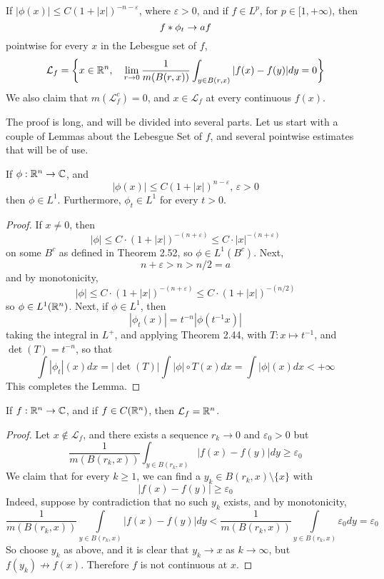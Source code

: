 \documentclass[../../main.tex]{subfiles}
\begin{document}
\providecommand{\wl}{\mathcal{L}}
\begin{wts}
    If $|\phi(x)|\leq C(1+|x|)^{-n-\varepsilon}$, where $\varepsilon>0$, and if $f\in L^p$, for $p\in[1,+\infty)$, then \[f\ast \phi_t\to af\]
    pointwise for every $x$ in the Lebesgue set of $f$, \[\mathcal{L}_f = \biggl\{{x\in\mathbb{R}^n,\quad\lim_{r\to 0}\dfrac{1}{m(B(r,x))}\int_{y\in B(r,x)}|f(x)-f(y)|dy = 0}\biggr\}\]
    We also claim that $m(\mathcal{L}_f^c)=0$, and $x\in \mathcal{L}_f$ at every continuous $f(x)$.
\end{wts}
The proof is long, and will be divided into several parts. Let us start with a couple of Lemmas about the Lebesgue Set of $f$, and several pointwise estimates that will be of use.
\begin{lemma}
    If $\phi:\mathbb{R}^n\to\mathbb{C}$, and\begin{equation}\label{phi estimate}
    |\phi(x)|\leq C(1+|x|)^{n-\varepsilon},\,\varepsilon>0\end{equation}
    then $\phi\in L^1$. Furthermore, $\phi_t\in L^1$ for every $t>0$.
\end{lemma}
\begin{proof}
    If $x\neq 0$, then
    \[
    |\phi|\leq C\cdot(1+|x|)^{-(n+\varepsilon)}\leq C\cdot|x|^{-(n+\varepsilon)}
    \]
    on some $B^c$ as defined in Theorem 2.52, so $\phi\in L^1(B^c)$. Next, \[n+\varepsilon>n>n/2=a\]
    and by monotonicity,\[|\phi|\leq C\cdot(1+|x|)^{-(n+\varepsilon)}\leq C\cdot (1+|x|)^{-(n/2)}\]
    so $\phi\in L^1(\mathbb{R}^n)$. Next, if $\phi\in L^1$, then\[|\phi_t(x)|=t^{-n}|\phi(t^{-1}x)|\]
    taking the integral in $L^+$, and applying Theorem 2.44, with $T:x\mapsto t^{-1}$, and $\det(T)=t^{-n}$, so that\[\int|\phi_t|(x)dx=|\det(T)|\int |\phi|\circ T(x)dx=\int |\phi|(x)dx<+\infty\]
    This completes the Lemma.
\end{proof}

\begin{lemma}\label{lemma:lebesgue set continuity}
    If $f:\mathbb{R}^n\to\mathbb{C}$, and if $f\in C(\mathbb{R}^n)$, then $\mathcal{L}_f=\mathbb{R}^n$.
\end{lemma}
\begin{proof}
    Let $x\notin\wl_f$, and there exists a sequence $r_k\to 0$ and $\varepsilon_0>0$ but \[\dfrac{1}{m(B(r_k,x))}\int_{y\in B(r_k,x)}|f(x)-f(y)|dy\geq \varepsilon_0\]
    We claim that for every $k\geq 1$, we can find a $y_k\in B(r_k,x)\setminus\{x\}$ with\[|f(x)-f(y)|\geq\varepsilon_0\]
    Indeed, suppose by contradiction that no such $y_k$ exists, and by monotonicity, \[\dfrac{1}{m(B(r_k,x))}\int\limits_{y\in B(r_k,x)}|f(x)-f(y)|dy<\dfrac{1}{m(B(r_k,x))}\int\limits_{y\in B(r_k,x)}\varepsilon_0dy=\varepsilon_0\]
    So choose $y_k$ as above, and it is clear that $y_k\to x$ as $k\to\infty$, but $f(y_k)\not\to f(x)$. Therefore $f$ is not continuous at $x$.
\end{proof}
\end{document}
